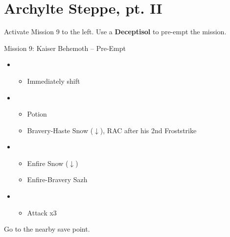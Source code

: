 \chapter{Archylte Steppe, pt. II}

Activate Mission 9 to the left.
Use a \textbf{Deceptisol} to pre-empt the mission.

\begin{battle}{Mission 9: Kaiser Behemoth -- Pre-Empt}
	\begin{itemize}
		\item \sixth
			\begin{itemize}
				\item Immediately shift
			\end{itemize}
		\item \fourth
			\begin{itemize}
				\item Potion
				\item Bravery-Haste Snow ($\downarrow$), RAC after his 2nd Froststrike
			\end{itemize}
		\item \third
			\begin{itemize}
				\item Enfire Snow ($\downarrow$)
				\item Enfire-Bravery Sazh
			\end{itemize}
		\item \fifth
			\begin{itemize}
				\item Attack x3
			\end{itemize}
	\end{itemize}
\end{battle}

Go to the nearby save point.


